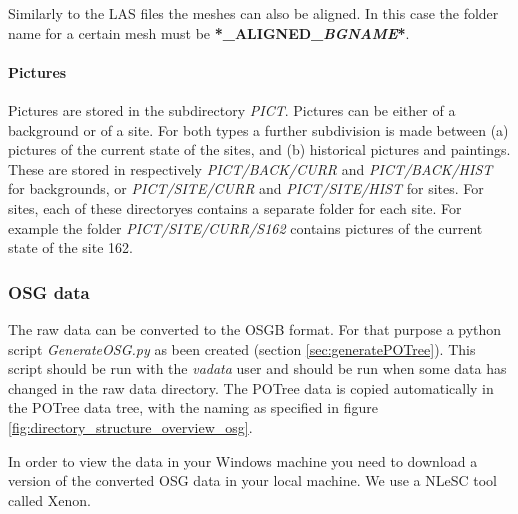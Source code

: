 Similarly to the LAS files the meshes can also be aligned. In this case the folder name for a certain mesh must be \textbf{*\_ALIGNED\_\textit{BGNAME}*}. 

\paragraph{Pictures}
Pictures are stored in the subdirectory \textit{PICT}. Pictures can be either of a background or of a site. For both types a further subdivision is made between (a) pictures of the current state of the sites, and (b) historical pictures and paintings. These are stored in respectively \textit{PICT/BACK/CURR} and \textit{PICT/BACK/HIST} for backgrounds, or \textit{PICT/SITE/CURR} and \textit{PICT/SITE/HIST} for sites. For sites, each of these directoryes contains a separate folder for each site. For example the folder \textit{PICT/SITE/CURR/S162} contains pictures of the current state of the site 162.

\subsubsection{OSG data}
The raw data can be converted to the OSGB format. For that purpose a python script \textit{GenerateOSG.py} as been created (section \ref{sec:generatePOTree}). This script should be run with the \textit{vadata} user and should be run when some data has changed in the raw data directory. The POTree data is copied automatically in the POTree data tree, with the naming as specified in figure \ref{fig:directory_structure_overview_osg}.

In order to view the data in your Windows machine you need to download a version of the converted OSG data in your local machine. We use a NLeSC tool called Xenon.

